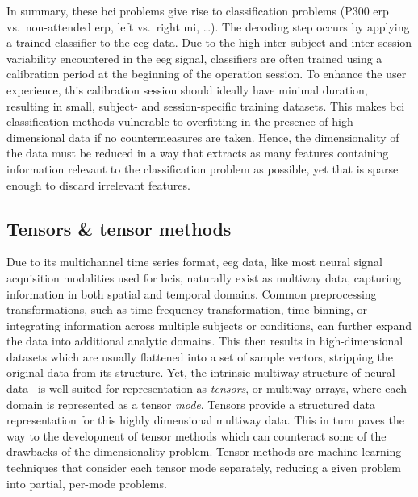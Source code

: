 \documentclass[twocolumn]{article}
\begin{document}
In summary, these \ac{bci} problems give rise to classification problems (P300
\ac{erp} vs.\ non-attended \ac{erp}, left vs.\ right \ac{mi}, \ldots).
The decoding step occurs by applying a trained classifier to the  \ac{eeg}
data.
Due to the high inter-subject and inter-session variability encountered in
the \ac{eeg} signal, classifiers are often trained using a calibration period
at the beginning of the operation session.
To enhance the user experience, this calibration session should ideally have minimal
duration, resulting in small, subject- and session-specific training datasets.
This makes \ac{bci} classification methods vulnerable to overfitting in the
presence of high-dimensional data if no countermeasures are taken.
Hence, the dimensionality of the data must be reduced in a way that extracts as
many features containing information relevant to the classification problem as
possible, yet that is sparse enough to discard irrelevant features.

\subsection{Tensors \& tensor methods}

Due to its multichannel time series format, \ac{eeg} data, like most neural
signal acquisition modalities used for \acp{bci}, naturally exist as multiway data,
capturing information in both spatial and temporal domains.
Common preprocessing transformations, such as time-frequency transformation,
time-binning, or integrating information across multiple subjects or conditions,
can further expand the data into additional analytic domains.
This then results in high-dimensional datasets which are usually flattened into a
set of sample vectors, stripping the original data from its structure.
Yet, the intrinsic multiway structure of neural data~\cite{Erol2022} is
well-suited for representation as \emph{tensors}, or multiway arrays, where
each domain is represented as a tensor \emph{mode}.
Tensors provide a structured data representation for this highly dimensional
multiway data.
This in turn paves the way to the development of tensor methods which can
counteract some of the drawbacks of the dimensionality problem.
Tensor methods are machine learning techniques that consider each tensor mode
separately, reducing a given problem into partial, per-mode problems.
\end{document}
